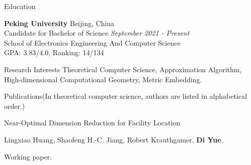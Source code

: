 \documentclass{resume} %
\begin{document}

\begin{rSection}{Education}

{\bf Peking University} \hfill {Beijing, China} 
\\ Candidate for Bachelor of Science \hfill {\em September 2021 - Present}
\\ School of Electronics Engineering And Computer Science
\\ GPA: 3.83/4.0, Ranking: 14/134



\end{rSection}

\begin{rSection}{Research Interests}{}
Theoretical Computer Science, Approximation Algorithm, High-dimensional Computational Geometry, Metric Embedding.
\end{rSection}

\begin{rSection}{Publications}{(In theoretical computer science, authors are listed in alphabetical order.)}

    \begin{pubSubsection}{Near-Optimal Dimension Reduction for Facility Location}
        \item Lingxiao Huang, Shaofeng H.-C. Jiang, Robert Krauthgamer, \textbf{Di Yue}.
        \item Working paper.%
    \end{pubSubsection}
\end{rSection}
\end{document}
